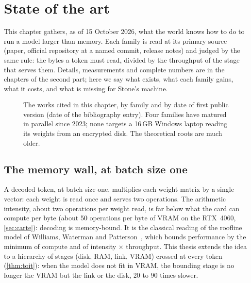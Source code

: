 \chapter{State of the art}\label{ch:etat}

\begin{origine}
This chapter gathers, as of 15 October 2026, what the world knows how to do to run a model larger than memory. Each family is read at its primary source (paper, official repository at a named commit, release notes) and judged by the same rule: the bytes a token must read, divided by the throughput of the stage that serves them. Details, measurements and complete numbers are in the chapters of the second part; here we say what exists, what each family gains, what it costs, and what is missing for Stone's machine.
\end{origine}

\begin{figure}[ht]
\centering
\resizebox{\linewidth}{!}{\SchemaChronologie}
\caption[Timeline of the works, by family]{The works cited in this chapter, by family and by date of first public version (date of the bibliography entry). Four families have matured in parallel since 2023; none targets a 16\,GB Windows laptop reading its weights from an encrypted disk. The theoretical roots are much older.}
\label{fig:chronologie}
\end{figure}

\section{The memory wall, at batch size one}\label{sec:mur}

A decoded token, at batch size one, multiplies each weight matrix by a single vector: each weight is read once and serves two operations. The arithmetic intensity, about two operations per weight read, is far below what the card can compute per byte (about 50 operations per byte of VRAM on the RTX~4060, \cref{sec:carte}): decoding is memory-bound. It is the classical reading of the roofline model of Williams, Waterman and Patterson~\cite{williams2009roofline}, which bounds performance by the minimum of compute and of intensity $\times$ throughput. This thesis extends the idea to a hierarchy of stages (disk, RAM, link, VRAM) crossed at every token (\cref{thm:toit}): when the model does not fit in VRAM, the bounding stage is no longer the VRAM but the link or the disk, 20 to 90 times slower.

